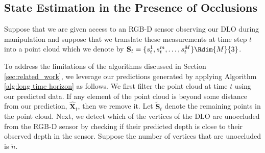 \subsection{State Estimation in the Presence of Occlusions}
\label{section: filter}

Suppose that we are given access to an RGB-D sensor observing our DLO during manipulation and suppose that we translate these measurements at time step $t$ into a point cloud which we denote by  $\textbf{S}_t = \{s_t^1, s_t^m, \dots, s_t^M\} \Rdim{M}{3}$.

To address the limitations of the algorithms discussed in Section \ref{sec:related_work}, we leverage our predictions generated by applying Algorithm \ref{alg:long time horizon} as follows.
We first filter the point cloud at time $t$ using our predicted data.
If any element of the point cloud is beyond some distance from our prediction, $\hat{\textbf{X}}_t$, then we remove it.
Let $\tilde{\textbf{S}}_t$ denote the remaining points in the point cloud.
Next, we detect which of the vertices of the DLO are unoccluded from the RGB-D sensor by checking if their predicted depth is close to their observed depth in the sensor.
Suppose the number of vertices that are unoccluded is $\tilde{n}$.

